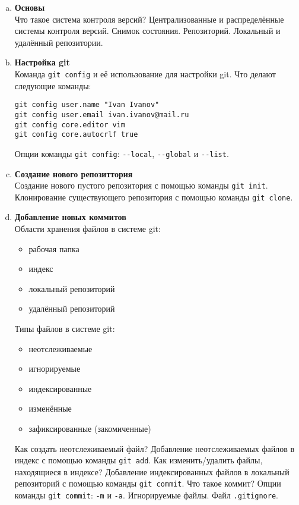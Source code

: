 \documentclass{article}
\begin{document}
\begin{enumerate}
\begin{enumerate}[a.]
\item \textbf{Основы}\\
Что такое система контроля версий? Централизованные и распределённые системы контроля версий. Снимок состояния. Репозиторий. Локальный и удалённый репозитории.
\item \textbf{Настройка git}\\
Команда \texttt{git config} и её использование для настройки git. Что делают следующие команды:
\begin{lstlisting}
git config user.name "Ivan Ivanov"
git config user.email ivan.ivanov@mail.ru
git config core.editor vim
git config core.autocrlf true
\end{lstlisting}
Опции команды \texttt{git config}: \texttt{-{}-local}, \texttt{-{}-global} и \texttt{-{}-list}.
\item \textbf{Создание нового репозиттория}\\
Создание нового пустого репозитория с помощью команды \texttt{git init}. Клонирование существующего репозитория с помощью команды \texttt{git clone}.

\item \textbf{Добавление новых коммитов}\\
Области хранения файлов в системе git:
\begin{itemize}
\item рабочая папка
\item индекс
\item локальный репозиторий
\item удалённый репозиторий
\end{itemize}

Типы файлов в системе git:
\begin{itemize}
\item неотслеживаемые
\item игнорируемые
\item индексированные
\item изменённые
\item зафиксированные (закомиченные)
\end{itemize}

Как создать неотслеживаемый файл?
Добавление неотслеживаемых файлов в индекс с помощью команды \texttt{git add}. 
Как изменить/удалить файлы, находящиеся в индексе?
Добавление индексированных файлов в локальный репозиторий с помощью команды \texttt{git commit}.
Что такое коммит?
Опции команды \texttt{git commit}: \texttt{-m} и \texttt{-a}.
Игнорируемые файлы. Файл \texttt{.gitignore}.


\end{enumerate}
\end{enumerate}
\end{document}

